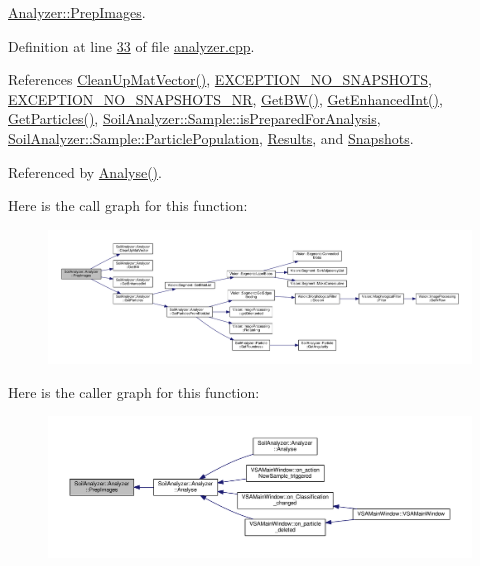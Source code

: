 \hyperlink{class_soil_analyzer_1_1_analyzer_a5b299a425580620ba409112971bc787e}{Analyzer\+::\+Prep\+Images}. 



Definition at line \hyperlink{analyzer_8cpp_source_l00033}{33} of file \hyperlink{analyzer_8cpp_source}{analyzer.\+cpp}.



References \hyperlink{class_soil_analyzer_1_1_analyzer_a9b143f9920d90ecd54a3b0bb3b0e28fc}{Clean\+Up\+Mat\+Vector()}, \hyperlink{soilanalyzerexception_8h_source_l00009}{E\+X\+C\+E\+P\+T\+I\+O\+N\+\_\+\+N\+O\+\_\+\+S\+N\+A\+P\+S\+H\+O\+T\+S}, \hyperlink{soilanalyzerexception_8h_source_l00010}{E\+X\+C\+E\+P\+T\+I\+O\+N\+\_\+\+N\+O\+\_\+\+S\+N\+A\+P\+S\+H\+O\+T\+S\+\_\+\+N\+R}, \hyperlink{analyzer_8cpp_source_l00222}{Get\+B\+W()}, \hyperlink{class_soil_analyzer_1_1_analyzer_a0d15b639bbfa2becde2dbf5605d00757}{Get\+Enhanced\+Int()}, \hyperlink{analyzer_8cpp_source_l00303}{Get\+Particles()}, \hyperlink{sample_8h_source_l00057}{Soil\+Analyzer\+::\+Sample\+::is\+Prepared\+For\+Analysis}, \hyperlink{sample_8h_source_l00041}{Soil\+Analyzer\+::\+Sample\+::\+Particle\+Population}, \hyperlink{analyzer_8h_source_l00049}{Results}, and \hyperlink{analyzer_8h_source_l00046}{Snapshots}.



Referenced by \hyperlink{analyzer_8cpp_source_l00065}{Analyse()}.



Here is the call graph for this function\+:
\nopagebreak
\begin{figure}[H]
\begin{center}
\leavevmode
\includegraphics[width=350pt]{class_soil_analyzer_1_1_analyzer_a5b299a425580620ba409112971bc787e_cgraph}
\end{center}
\end{figure}




Here is the caller graph for this function\+:
\nopagebreak
\begin{figure}[H]
\begin{center}
\leavevmode
\includegraphics[width=350pt]{class_soil_analyzer_1_1_analyzer_a5b299a425580620ba409112971bc787e_icgraph}
\end{center}
\end{figure}




